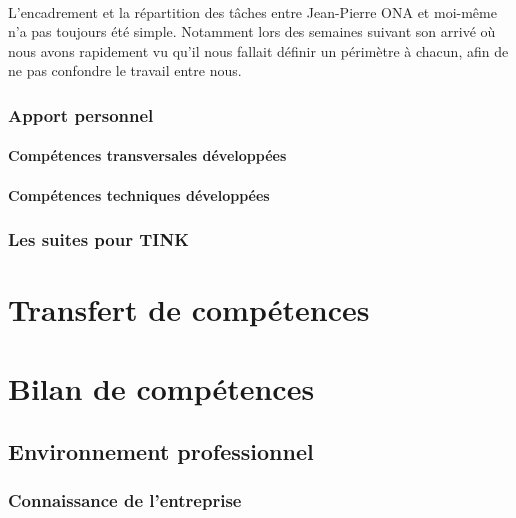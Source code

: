 \documentclass[12pt,a4paper]{report}
\begin{document}
\paragraph*{}L'encadrement et la répartition des tâches entre Jean-Pierre ONA et moi-même n'a pas toujours été simple. Notamment lors des semaines suivant son arrivé où nous avons rapidement vu qu'il nous fallait définir un périmètre à chacun, afin de ne pas confondre le travail entre nous.
\paragraph*{}

\subsubsection{Apport personnel}
\paragraph{Compétences transversales développées}
\paragraph{Compétences techniques développées}
\subsubsection{Les suites pour TINK}



\newpage
\section{Transfert de compétences}

\newpage
\section{Bilan de compétences} 
\subsection{Environnement professionnel}
\subsubsection{Connaissance de l'entreprise}
\end{document}
